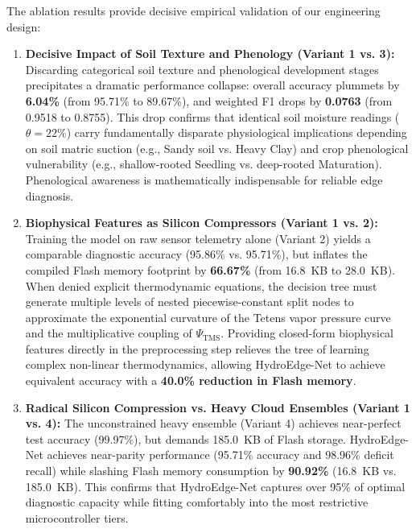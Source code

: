 The ablation results provide decisive empirical validation of our engineering design:
\begin{enumerate}
    \item \textbf{Decisive Impact of Soil Texture and Phenology (Variant 1 vs. 3):} Discarding categorical soil texture and phenological development stages precipitates a dramatic performance collapse: overall accuracy plummets by \textbf{6.04\%} (from 95.71\% to 89.67\%), and weighted F1 drops by \textbf{0.0763} (from 0.9518 to 0.8755). This drop confirms that identical soil moisture readings ($\theta = 22\%$) carry fundamentally disparate physiological implications depending on soil matric suction (e.g., Sandy soil vs. Heavy Clay) and crop phenological vulnerability (e.g., shallow-rooted Seedling vs. deep-rooted Maturation). Phenological awareness is mathematically indispensable for reliable edge diagnosis.
    \item \textbf{Biophysical Features as Silicon Compressors (Variant 1 vs. 2):} Training the model on raw sensor telemetry alone (Variant 2) yields a comparable diagnostic accuracy (95.86\% vs. 95.71\%), but inflates the compiled Flash memory footprint by \textbf{66.67\%} (from 16.8~KB to 28.0~KB). When denied explicit thermodynamic equations, the decision tree must generate multiple levels of nested piecewise-constant split nodes to approximate the exponential curvature of the Tetens vapor pressure curve and the multiplicative coupling of $\Psi_{\text{TMS}}$. Providing closed-form biophysical features directly in the preprocessing step relieves the tree of learning complex non-linear thermodynamics, allowing HydroEdge-Net to achieve equivalent accuracy with a \textbf{40.0\% reduction in Flash memory}.
    \item \textbf{Radical Silicon Compression vs. Heavy Cloud Ensembles (Variant 1 vs. 4):} The unconstrained heavy ensemble (Variant 4) achieves near-perfect test accuracy (99.97\%), but demands 185.0~KB of Flash storage. HydroEdge-Net achieves near-parity performance (95.71\% accuracy and 98.96\% deficit recall) while slashing Flash memory consumption by \textbf{90.92\%} (16.8~KB vs. 185.0~KB). This confirms that HydroEdge-Net captures over 95\% of optimal diagnostic capacity while fitting comfortably into the most restrictive microcontroller tiers.
\end{enumerate}

